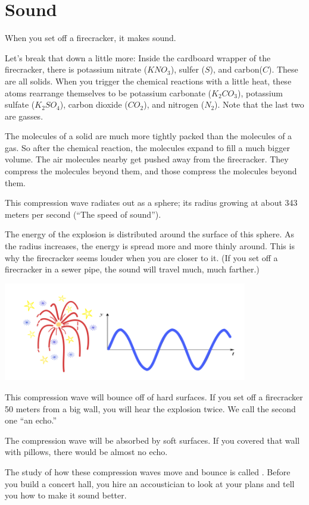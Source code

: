 \chapter{Sound}

When you set off a firecracker, it makes sound.

Let's break that down a little more: Inside the cardboard wrapper of
the firecracker, there is potassium nitrate ($KNO_3$), sulfer ($S$),
and carbon($C$).  These are all solids. When you trigger the chemical
reactions with a little heat, these atoms rearrange themselves to be
potassium carbonate ($K_2CO_3$), potassium sulfate ($K_2SO_4$), carbon
dioxide ($CO_2$), and nitrogen ($N_2$). Note that the last two are
gasses.

The molecules of a solid are much more tightly packed than the
molecules of a gas. So after the chemical reaction, the molecules
expand to fill a much bigger volume. The air molecules nearby get
pushed away from the firecracker.  They compress the molecules beyond
them, and those compress the molecules beyond them.

This compression wave radiates out as a sphere; its radius growing at
about 343 meters per second (``The speed of sound'').

The energy of the explosion is distributed around the surface of this
sphere. As the radius increases, the energy is spread more and more
thinly around. This is why the firecracker seems louder when you are
closer to it. (If you set off a firecracker in a sewer pipe, the sound
will travel much, much farther.)

\includegraphics[width=0.8\textwidth]{firework.png}


This compression wave will bounce off of hard surfaces. If you set off
a firecracker 50 meters from a big wall, you will hear the explosion
twice. We call the second one ``an echo.''

The compression wave will be absorbed by soft surfaces. If you covered
that wall with pillows, there would be almost no echo.

The study of how these compression waves move and bounce is called
. Before you build a concert hall, you hire an
accoustician to look at your plans and tell you how to make it sound
better.

